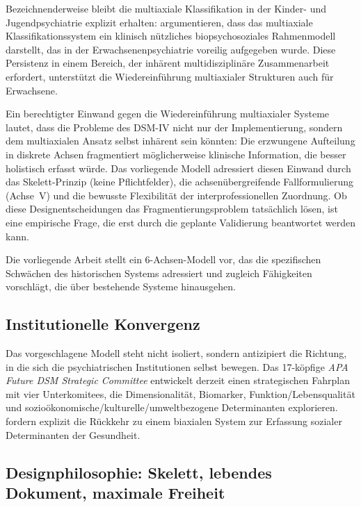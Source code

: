 \documentclass[11pt,a4paper]{article}
\begin{document}
Bezeichnenderweise bleibt die multiaxiale Klassifikation in der Kinder- und Jugendpsychiatrie explizit erhalten: \citet{BJPsychAdv2024} argumentieren, dass das multiaxiale Klassifikationssystem ein \glqq klinisch n\"utzliches biopsychosoziales Rahmenmodell\grqq{} darstellt, das in der Erwachsenenpsychiatrie voreilig aufgegeben wurde. Diese Persistenz in einem Bereich, der inh\"arent multidisziplin\"are Zusammenarbeit erfordert, unterst\"utzt die Wiedereinf\"uhrung multiaxialer Strukturen auch f\"ur Erwachsene.

Ein berechtigter Einwand gegen die Wiedereinf\"uhrung multiaxialer Systeme lautet, dass die Probleme des DSM-IV nicht nur der Implementierung, sondern dem multiaxialen Ansatz selbst inh\"arent sein k\"onnten: Die erzwungene Aufteilung in diskrete Achsen fragmentiert m\"oglicherweise klinische Information, die besser holistisch erfasst w\"urde. Das vorliegende Modell adressiert diesen Einwand durch das Skelett-Prinzip (keine Pflichtfelder), die achsen\"ubergreifende Fallformulierung (Achse~V) und die bewusste Flexibilit\"at der interprofessionellen Zuordnung. Ob diese Designentscheidungen das Fragmentierungsproblem tats\"achlich l\"osen, ist eine empirische Frage, die erst durch die geplante Validierung beantwortet werden kann.

Die vorliegende Arbeit stellt ein 6-Achsen-Modell vor, das die spezifischen Schw\"achen des historischen Systems adressiert und zugleich F\"ahigkeiten vorschl\"agt, die \"uber bestehende Systeme hinausgehen.

\subsection{Institutionelle Konvergenz}

Das vorgeschlagene Modell steht nicht isoliert, sondern antizipiert die Richtung, in die sich die psychiatrischen Institutionen selbst bewegen. Das 17-k\"opfige \textit{APA Future DSM Strategic Committee} entwickelt derzeit einen \glqq strategischen Fahrplan\grqq{} mit vier Unterkomitees, die Dimensionalit\"at, Biomarker, Funktion/Lebensqualit\"at und sozio\"okonomische/kulturelle/umweltbezogene Determinanten explorieren. \citet{ErlichFirst2025} fordern explizit die R\"uckkehr zu einem biaxialen System zur Erfassung sozialer Determinanten der Gesundheit.


\subsection{Designphilosophie: Skelett, lebendes Dokument, maximale Freiheit}
\label{sec:designphilosophie}
\end{document}

